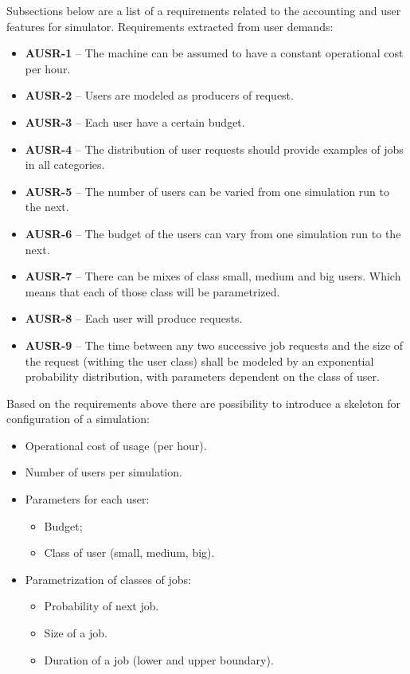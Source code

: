 \documentclass{report}
\begin{document}
Subsections below are a list of a requirements related to the accounting and user features for simulator.
Requirements extracted from user demands:
\begin{itemize}
	\item
	{
		\textbf{AUSR-1} -- The machine can be assumed to have a constant operational cost per hour.
	}
	\item
	{
		\textbf{AUSR-2} -- Users are modeled as producers of request.
	}
	\item
	{
		\textbf{AUSR-3} -- Each user have a certain budget.
	}
	\item
	{
		\textbf{AUSR-4} -- The distribution of user requests should provide examples of jobs in all categories.
	}
	\item
	{
		\textbf{AUSR-5} -- The number of users can be varied from one simulation run to the next.
	}
	\item
	{
		\textbf{AUSR-6} -- The budget of the users can vary from one simulation run to the next.
	}
	\item
	{
		\textbf{AUSR-7} -- There can be mixes of class small, medium and big users. Which means that each of those class will be parametrized. 
	}
	\item
	{
		\textbf{AUSR-8} -- Each user will produce requests. 
	}
	\item
	{
		\textbf{AUSR-9} -- The time between any two successive job requests and the size of the request (withing the user class) shall be modeled by an exponential probability distribution, with parameters dependent on the class of user.
	}
\end{itemize}

Based on the requirements above there are possibility to introduce a skeleton for configuration of a simulation:

\begin{itemize}
	\item
	{
		Operational cost of usage (per hour).
	}
	\item
	{
		Number of users per simulation.
	}
	\item
	{
		Parameters for each user:
		\begin{itemize}
			\item Budget;
			\item Class of user (small, medium, big).
		\end{itemize}
	}
	\item
	{
		Parametrization of classes of jobs:
		\begin{itemize}
			\item Probability of next job.
			\item Size of a job.
			\item Duration of a job (lower and upper boundary).
		\end{itemize}
	}
\end{itemize}
\end{document}

